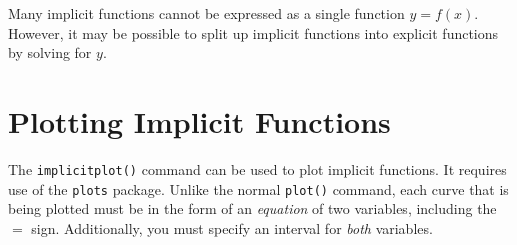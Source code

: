 Many implicit functions cannot be expressed as a single function $y=f(x)$. However, it may be possible to split up implicit functions into explicit functions by solving for $y$.


\begin{maplegroup}
\begin{mapleinput}
\end{mapleinput}
\mapleresult
\begin{maplelatex}
\end{maplelatex}
\end{maplegroup}


\begin{maplegroup}
\begin{mapleinput}
\end{mapleinput}
\mapleresult
\begin{maplelatex}
\end{maplelatex}
\end{maplegroup}

\section{Plotting Implicit Functions}
\label{sec:plotting_implicit_functions}

The \texttt{implicitplot()} command can be used to plot implicit functions. It requires use of the \texttt{plots} package. Unlike the normal \texttt{plot()} command, each curve that is being plotted must be in the form of an \textit{equation} of two variables, including the $=$ sign. Additionally, you must specify an interval for \textit{both} variables.

